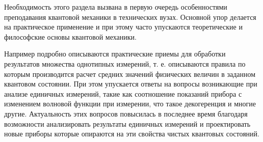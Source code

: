 Необходимость этого раздела вызвана в первую очередь особенностями
преподавания квантовой механики в технических вузах. Основной упор
делается на практическое применение и при этому часто упускаются
теоретические и философские основы квантовой механики.

Например подробно описываются практические приемы для обработки
результатов множества однотипных измерений, т. е. описываются правила
по которым производится расчет средних значений физических величин в
заданном квантовом состоянии. При этом упускается ответы на вопросы
возникающие при анализе единичных измерений, такие как соотношение
показаний прибора с изменением волновой функции при измерении, что
такое декогеренция и многие другие. Актуальность этих вопросов
повысилась в последнее время благодаря возможности анализировать
результаты единичных измерений и проектировать новые приборы которые
опираются на эти свойства чистых квантовых состояний.
